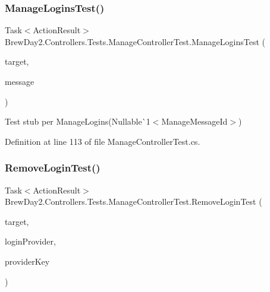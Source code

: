 \mbox{\label{class_brew_day2_1_1_controllers_1_1_tests_1_1_manage_controller_test_a11c045a4deeaabd30404223005592828}} 
\subsubsection{\texorpdfstring{Manage\+Logins\+Test()}{ManageLoginsTest()}}
{\footnotesize\ttfamily Task$<$Action\+Result$>$ Brew\+Day2.\+Controllers.\+Tests.\+Manage\+Controller\+Test.\+Manage\+Logins\+Test (\begin{DoxyParamCaption}\item[{\mbox{[}\+Pex\+Assume\+Under\+Test\mbox{]} \mbox{\hyperlink{class_brew_day2_1_1_controllers_1_1_manage_controller}{Manage\+Controller}}}]{target,  }\item[{\mbox{\hyperlink{class_brew_day2_1_1_controllers_1_1_manage_controller_a418038dc90e9d94606f474b9c06fd8c8}{Manage\+Controller.\+Manage\+Message\+Id}}?}]{message }\end{DoxyParamCaption})}



Test stub per Manage\+Logins(Nullable\`{}1$<$Manage\+Message\+Id$>$)



Definition at line 113 of file Manage\+Controller\+Test.\+cs.

\mbox{\label{class_brew_day2_1_1_controllers_1_1_tests_1_1_manage_controller_test_a7e55796fc031c08e811854541aa8a7c6}} 
\subsubsection{\texorpdfstring{Remove\+Login\+Test()}{RemoveLoginTest()}}
{\footnotesize\ttfamily Task$<$Action\+Result$>$ Brew\+Day2.\+Controllers.\+Tests.\+Manage\+Controller\+Test.\+Remove\+Login\+Test (\begin{DoxyParamCaption}\item[{\mbox{[}\+Pex\+Assume\+Under\+Test\mbox{]} \mbox{\hyperlink{class_brew_day2_1_1_controllers_1_1_manage_controller}{Manage\+Controller}}}]{target,  }\item[{string}]{login\+Provider,  }\item[{string}]{provider\+Key }\end{DoxyParamCaption})}



